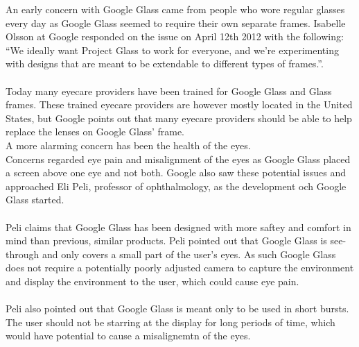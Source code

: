 An early concern with Google Glass came from people who wore regular glasses every day as Google Glass seemed to require their own separate frames. Isabelle Olsson at Google responded on the issue on April 12th 2012 with the following: ``We ideally want Project Glass to work for everyone, and we're experimenting with designs that are meant to be extendable to different types of frames.''.\cite{GoogleGlassFrameResponse}
\\
\\
Today many eyecare providers have been trained for Google Glass and Glass frames. These trained eyecare providers are however mostly located in the United States,\cite{frameProviders} but Google points out that many eyecare providers should be able to help replace the lenses on Google Glass' frame\cite{framesGlass}.\
\ 
\\
A more alarming concern has been the health of the eyes. \cite{ackerman13}\\Concerns regarded eye pain and misalignment of the eyes as Google Glass placed a screen above one eye and not both. Google also saw these potential issues and approached Eli Peli, professor of ophthalmology, as the development och Google Glass started.
\\
\\
Peli claims that Google Glass has been designed with more saftey and comfort in mind than previous, similar products. Peli pointed out that Google Glass is see-through and only covers a small part of the user's eyes. As such Google Glass does not require a potentially poorly adjusted camera to capture the environment and display the environment to the user, which could cause eye pain.
\\
\\
Peli also pointed out that Google Glass is meant only to be used in short bursts. The user should not be starring at the display for long periods of time, which would have potential to cause a misalignemtn of the eyes.
\\
\\
%

